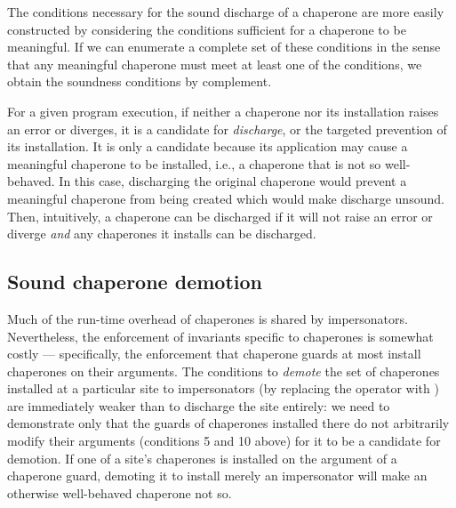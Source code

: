 

The conditions necessary for the sound discharge of a chaperone are more easily constructed by considering the conditions sufficient for a chaperone to be meaningful.
If we can enumerate a complete set of these conditions in the sense that any meaningful chaperone must meet at least one of the conditions, we obtain the soundness conditions by complement.





For a given program execution, if neither a chaperone nor its installation raises an error or diverges, it is a candidate for \emph{discharge}, or the targeted prevention of its installation.
It is only a candidate because its application may cause a meaningful chaperone to be installed, i.e., a chaperone that is not so well-behaved.
In this case, discharging the original chaperone would prevent a meaningful chaperone from being created which would make discharge unsound.
Then, intuitively, a chaperone can be discharged if it will not raise an error or diverge  \emph{and} any chaperones it installs can be discharged.





\subsection{Sound chaperone demotion}

Much of the run-time overhead of chaperones is shared by impersonators.
Nevertheless, the enforcement of invariants specific to chaperones is somewhat costly --- specifically, the enforcement that chaperone guards at most install chaperones on their arguments.
The conditions to \emph{demote} the set of chaperones installed at a particular site to impersonators (by replacing the  operator with ) are immediately weaker than to discharge the site entirely: we need to demonstrate only that the guards of chaperones installed there do not arbitrarily modify their arguments (conditions 5 and 10 above) for it to be a candidate for demotion.
If one of a site's chaperones is installed on the argument of a chaperone guard, demoting it to install merely an impersonator will make an otherwise well-behaved chaperone not so.

